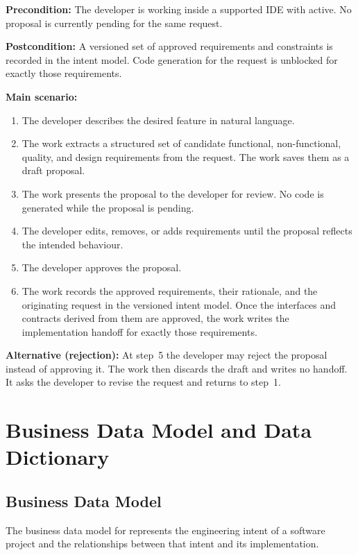 \documentclass[12pt]{article}
\begin{document}
\medskip
\noindent\textbf{Precondition:} The developer is working inside a supported IDE
with \progname{} active. No proposal is currently pending for the same request.

\medskip
\noindent\textbf{Postcondition:} A versioned set of approved requirements and
constraints is recorded in the intent model. Code generation for the request is
unblocked for exactly those requirements.

\medskip
\noindent\textbf{Main scenario:}
\begin{enumerate}
  \item The developer describes the desired feature in natural language.
  \item The work extracts a structured set of candidate functional,
  non-functional, quality, and design requirements from the request. The work
  saves them as a draft proposal.
  \item The work presents the proposal to the developer for review. No code is
  generated while the proposal is pending.
  \item The developer edits, removes, or adds requirements until the proposal
  reflects the intended behaviour.
  \item The developer approves the proposal.
  \item The work records the approved requirements, their rationale, and the
  originating request in the versioned intent model. Once the interfaces and
  contracts derived from them are approved, the work writes the implementation
  handoff for exactly those requirements.
\end{enumerate}

\medskip
\noindent\textbf{Alternative (rejection):} At step~5 the developer may reject
the proposal instead of approving it. The work then discards the draft and writes no
handoff. It asks the developer to revise the request and returns to
step~1.

\section{Business Data Model and Data Dictionary}
\subsection{Business Data Model}

The business data model for \progname{} represents the engineering intent of a
software project and the relationships between that intent and its implementation.
\end{document}
